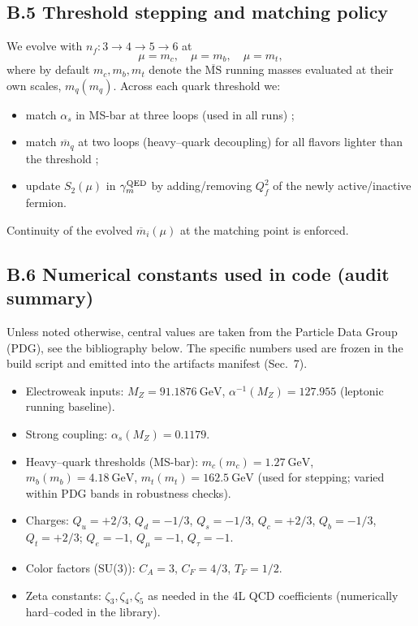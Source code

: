 \documentclass[epjc3]{svjour3}
\begin{document}
\subsection*{B.5 Threshold stepping and matching policy}
We evolve with $n_f:3\to4\to5\to6$ at
\[
\mu=m_c,\quad \mu=m_b,\quad \mu=m_t,
\]
where by default $m_c,m_b,m_t$ denote the $\overline{\mathrm{MS}}$ running masses evaluated at their own scales, $m_q(m_q)$. Across each quark threshold we:
\begin{itemize}
\item match $\alpha_s$ in MS-bar at three loops (used in all runs) \cite{CKS1998,RunDec3};
\item match $\overline{m}_q$ at two loops (heavy–quark decoupling) for all flavors lighter than the threshold \cite{CKS1998};
\item update $S_2(\mu)$ in $\gamma_m^{\rm QED}$ by adding/removing $Q_f^2$ of the newly active/inactive fermion.
\end{itemize}
Continuity of the evolved $\overline{m}_i(\mu)$ at the matching point is enforced.

\subsection*{B.6 Numerical constants used in code (audit summary)}
Unless noted otherwise, central values are taken from the Particle Data Group (PDG), see the bibliography below. The specific numbers used are frozen in the build script and emitted into the artifacts manifest (Sec.~7).
\begin{itemize}
\item Electroweak inputs: $M_Z=91.1876~\mathrm{GeV}$, $\alpha^{-1}(M_Z)=127.955$ (leptonic running baseline).
\item Strong coupling: $\alpha_s(M_Z)=0.1179$.
\item Heavy–quark thresholds (MS-bar): $m_c(m_c)=1.27~\mathrm{GeV}$, $m_b(m_b)=4.18~\mathrm{GeV}$, $m_t(m_t)=162.5~\mathrm{GeV}$ (used for stepping; varied within PDG bands in robustness checks).
\item Charges: $Q_u=+2/3$, $Q_d=-1/3$, $Q_s=-1/3$, $Q_c=+2/3$, $Q_b=-1/3$, $Q_t=+2/3$; $Q_e=-1$, $Q_\mu=-1$, $Q_\tau=-1$.
\item Color factors (SU(3)): $C_A=3$, $C_F=4/3$, $T_F=1/2$.
\item Zeta constants: $\zeta_3, \zeta_4, \zeta_5$ as needed in the 4L QCD coefficients (numerically hard–coded in the library).
\end{itemize}
\end{document}
